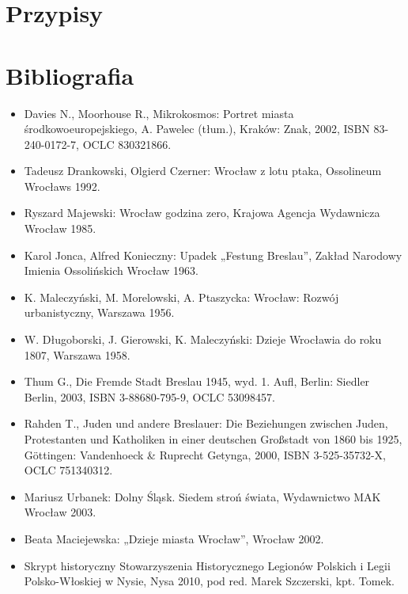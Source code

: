 \documentclass{article}
\begin{document}
\section{Przypisy}
\theendnotes
\section{Bibliografia}
\begin{itemize}
\item Davies N., Moorhouse R., Mikrokosmos: Portret miasta środkowoeuropejskiego, A. Pawelec (tłum.), Kraków: Znak, 2002, ISBN 83-240-0172-7, OCLC 830321866.
\item Tadeusz Drankowski, Olgierd Czerner: Wrocław z lotu ptaka, Ossolineum Wrocławs 1992.
\item Ryszard Majewski: Wrocław godzina zero, Krajowa Agencja Wydawnicza Wrocław 1985.
\item Karol Jonca, Alfred Konieczny: Upadek „Festung Breslau”, Zakład Narodowy Imienia Ossolińskich Wrocław 1963.
\item K. Maleczyński, M. Morelowski, A. Ptaszycka: Wrocław: Rozwój urbanistyczny, Warszawa 1956.
\item W. Długoborski, J. Gierowski, K. Maleczyński: Dzieje Wrocławia do roku 1807, Warszawa 1958.
\item Thum G., Die Fremde Stadt Breslau 1945, wyd. 1. Aufl, Berlin: Siedler Berlin, 2003, ISBN 3-88680-795-9, OCLC 53098457.
\item Rahden T., Juden und andere Breslauer: Die Beziehungen zwischen Juden, Protestanten und Katholiken in einer deutschen Großstadt von 1860 bis 1925, Göttingen: Vandenhoeck & Ruprecht Getynga, 2000, ISBN 3-525-35732-X, OCLC 751340312.
\item Mariusz Urbanek: Dolny Śląsk. Siedem stroń świata, Wydawnictwo MAK Wrocław 2003.
\item Beata Maciejewska: „Dzieje miasta Wrocław”, Wrocław 2002.
\item Skrypt historyczny Stowarzyszenia Historycznego Legionów Polskich i Legii Polsko-Włoskiej w Nysie, Nysa 2010, pod red. Marek Szczerski, kpt. Tomek.
\end{itemize}
\end{document}
